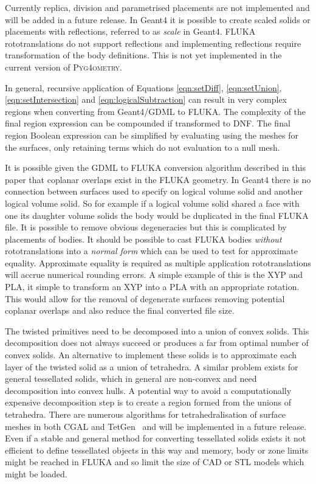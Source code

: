 \documentclass[final,5p,times,twocolumn]{elsarticle}
\newcommand{\PYGEOMETRY}{\textsc{Pyg4ometry}}
\begin{document}
Currently replica, division and parametrised placements are not implemented 
and will be added in a future release. In Geant4 it is possible to create scaled 
solids or placements with reflections, referred to as \emph{scale} in Geant4. FLUKA 
rototranslations do not support reflections and implementing reflections 
require transformation of the body definitions. This is not yet implemented 
in the current version of \PYGEOMETRY{}. 

In general, recursive application of Equations \ref{eqn:setDiff},
\ref{eqn:setUnion}, \ref{eqn:setIntersection} and \ref{eqn:logicalSubtraction} 
can result in very complex regions when converting from Geant4/GDML to 
FLUKA. The complexity of the final region expression can be compounded 
if transformed to DNF. The final region Boolean expression can be simplified by 
evaluating using the meshes for the surfaces, only retaining terms which 
do not evaluation to a null mesh.

It is possible given the GDML to FLUKA conversion algorithm described 
in this paper that coplanar overlaps exist in the FLUKA geometry.  In 
Geant4 there is no connection between surfaces used to specify on 
logical volume solid and another logical volume solid. So for example 
if a logical volume solid shared a face with one its daughter volume 
solids the body would be duplicated in the final FLUKA file. It 
is possible to remove obvious degeneracies but this is complicated by 
placements of bodies. It should be possible to cast FLUKA bodies 
{\em without} rototranslations into a {\em normal form} which can be used 
to test for approximate equality. Approximate equality is required as 
multiple application rototranslations will accrue numerical rounding errors.
A simple example of this is the XYP and PLA, it simple to transform an 
XYP into a PLA with an appropriate rotation. This would allow for the removal 
of degenerate surfaces removing potential coplanar overlaps and also reduce 
the final converted file size.

The twisted primitives need to be decomposed 
into a union of convex solids. This decomposition does not always 
succeed or produces a far from optimal number of convex solids. 
An alternative to implement these solids is to approximate each 
layer of the twisted solid as a union of tetrahedra. A similar problem 
exists for general tessellated solids, which in general
are non-convex and need decomposition into convex hulls. A potential 
way to avoid a computationally expensive decomposition step is to 
create a region formed from the unions of tetrahedra. There are numerous 
algorithms for tetrahedralisation of surface meshes in both CGAL and TetGen~\cite{tetgen}
and will be implemented in a future release. Even if a stable and general 
method for converting tessellated solids exists it not efficient to define 
tessellated objects in this way and memory, body or zone limits might
be reached in FLUKA and so limit the size of CAD or STL models which 
might be loaded.
\end{document}
